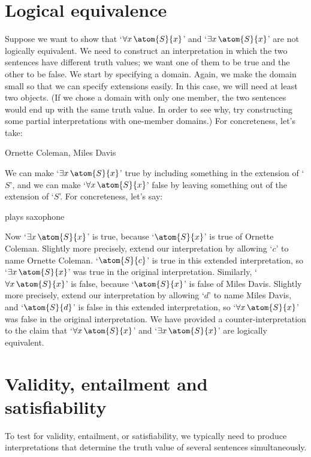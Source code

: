 \section{Logical equivalence}
Suppose we want to show that `$\forall x\, \atom{S}{x}$' and `$\exists x\, \atom{S}{x}$' are not logically equivalent. We need to construct an interpretation in which the two sentences have different truth values; we want one of them to be true and the other to be false. We start by specifying a domain. Again, we make the domain small so that we can specify extensions easily. In this case, we will need at least two objects. (If we chose a domain with only one member, the two sentences would end up with the same truth value. In order to see why, try constructing some partial interpretations with one-member domains.) For concreteness, let's take:
	\begin{ekey}
		\item[\text{domain}] Ornette Coleman, Miles Davis
	\end{ekey}
We can make `$\exists x\, \atom{S}{x}$' true by including something in the extension of `$S$', and we can make `$\forall x\, \atom{S}{x}$' false by leaving something out of the extension of `$S$'. For concreteness, let's say:
	\begin{ekey}
		\item[\atom{S}{x}]  plays saxophone
	\end{ekey}
Now `$\exists x\, \atom{S}{x}$' is true, because `$\atom{S}{x}$' is true of Ornette Coleman. Slightly more precisely, extend our interpretation by allowing `$c$' to name Ornette Coleman.  `$\atom{S}{c}$' is true in this extended interpretation, so `$\exists x\, \atom{S}{x}$' was true in the original interpretation. Similarly, `$\forall x\, \atom{S}{x}$' is false, because `$\atom{S}{x}$' is false of Miles Davis. Slightly more precisely, extend our interpretation by allowing `$d$' to name Miles Davis, and `$\atom{S}{d}$' is false in this extended interpretation, so `$\forall x\, \atom{S}{x}$' was false in the original interpretation. We have provided a counter-interpretation to the claim that `$\forall x\, \atom{S}{x}$' and `$\exists x\, \atom{S}{x}$' are logically equivalent.

\section{Validity, entailment and satisfiability}
To test for validity, entailment, or satisfiability, we typically need to produce interpretations that determine the truth value of several sentences simultaneously.

